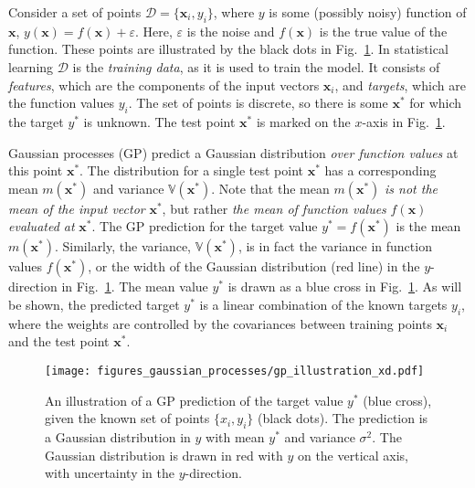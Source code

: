 \documentclass[twoside,english]{uiofysmaster}
\begin{document}
{{Consider a set of points $\mathcal{D} = \{\textbf{x}_i, y_i\}$, where $y$ is some (possibly noisy) function of $\textbf{x}$, $y(\textbf{x}) = f(\textbf{x}) + \varepsilon$. Here, $\varepsilon$ is the noise and $f(\textbf{x})$ is the true value of the function. These points are illustrated by the black dots in Fig.~\ref{Fig:: gaussian process : GP illustration}. In statistical learning $\mathcal{D}$ is the \textit{training data}, as it is used to train the model. It consists of \textit{features}, which are the components of the input vectors $\textbf{x}_i$, and \textit{targets}, which are the function values $y_i$. The set of points is discrete, so there is some $\textbf{x}^*$ for which the target $y^*$ is unknown. The test point $\textbf{x}^*$ is marked on the $x$-axis in Fig.~\ref{Fig:: gaussian process : GP illustration}.

Gaussian processes (GP) predict a Gaussian distribution \textit{over function values} at this point $\textbf{x}^*$. The distribution for a single test point $\textbf{x}^*$ has a corresponding mean $m(\textbf{x}^*)$ and variance $\mathbb{V}(\textbf{x}^*)$. Note that the mean $m(\textbf{x}^*)$ \textit{is not the mean of the input vector} $\textbf{x}^*$, but rather \textit{the mean of function values} $f(\textbf{x})$ \textit{evaluated at} $\textbf{x}^*$. The GP prediction for the target value $y^*=f(\textbf{x}^*)$ is the mean $m(\textbf{x}^*)$. Similarly, the variance, $\mathbb{V}(\textbf{x}^*)$, is in fact the variance in function values $f(\textbf{x}^*)$, or the width of the Gaussian distribution (red line) in the $y$-direction in Fig.~\ref{Fig:: gaussian process : GP illustration}. The mean value $y^*$ is drawn as a blue cross in Fig.~\ref{Fig:: gaussian process : GP illustration}. As will be shown, the predicted target $y^*$ is a linear combination of the known targets $y_i$, where the weights are controlled by the covariances between training points $\textbf{x}_i$ and the test point $\textbf{x}^*$.  


\begin{figure}
\centering
\texttt{[image: figures\_gaussian\_processes/gp\_illustration\_xd.pdf]}
\caption{An illustration of a GP prediction of the target value $y^*$ (blue cross), given the known set of points $\{x_i, y_i\}$ (black dots). The prediction is a Gaussian distribution in $y$ with mean $y^*$ and variance $\sigma^2$. The Gaussian distribution is drawn in red with $y$ on the vertical axis, with uncertainty in the $y$-direction.}
\label{Fig:: gaussian process : GP illustration}
\end{figure}

}}
\end{document}
